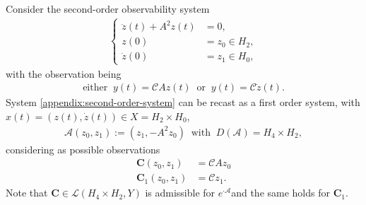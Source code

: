 \documentclass[JEP,XML,SOM,Unicode,published]{cedram}
\theoremstyle{definition}
\let\mc\mathcal
\newcommand{\A}{\mc{A}}
\newcommand{\bC}{\boldsymbol{C}}
\begin{document}
Consider the second-order observability system
\begin{align}\label{appendix:second-order-system}
\left\{\begin{array}{rl}
\ddot{z}(t)+A^2z(t)&=0, \\[3pt]
z(0)&=z_0\in H_2,\\[3pt]
\dot{z}(0)&=z_1\in H_0,
\end{array}\right.
\end{align}
with the observation being
\begin{align*}
\text{either }\ y(t)=\mc{C}Az(t)\ \text{ or }\ y(t)=\mc{C}\dot{z}(t).
\end{align*}
System \eqref{appendix:second-order-system} can be recast as a first order system, with $x(t)=(z(t), \dot{z}(t))\in X=H_2\times H_0$,
\begin{align*}
\A(z_0, z_1):=(z_1, -A^2z_0)\ \text{ with }\ D(\A)=H_4\times H_2,
\end{align*}
considering as possible observations
\begin{equation}
\begin{aligned}
\label{defobservplate}
\bC(z_0, z_1)&=\mc{C}Az_0\\
\bC_1(z_0, z_1)&=\mc{C}z_1.
\end{aligned}
\end{equation}
Note that $\bC\in \mc{L}(H_4\times H_2, Y)$ is admissible for $e^{\cdot \A}$and the same holds for $\bC_1$.
\end{document}
